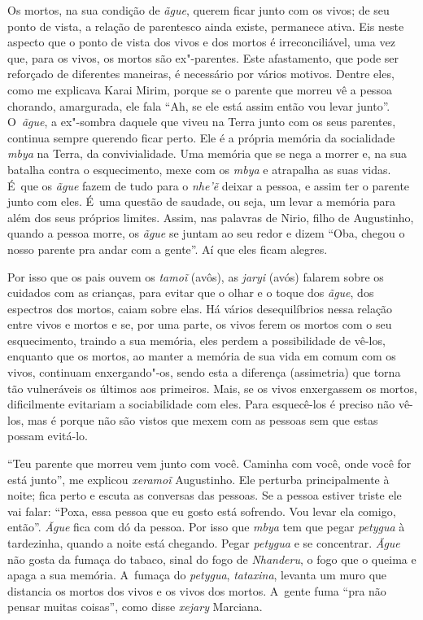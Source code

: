 Os mortos, na sua condição de \emph{ãgue}, querem ficar junto com os vivos; de
seu ponto de vista, a relação de parentesco ainda existe, permanece
ativa. Eis neste aspecto que o ponto de vista dos vivos e dos mortos é
irreconciliável, uma vez que, para os vivos, os mortos são ex"-parentes. 
Este afastamento, que pode ser reforçado de diferentes maneiras, é
necessário por vários motivos. Dentre eles, como me explicava Karai
Mirim, porque se o parente que morreu vê a pessoa chorando, amargurada,
ele fala ``Ah, se ele está assim então vou levar junto''. O~\emph{ãgue}, a
ex"-sombra daquele que viveu na Terra junto com os seus parentes,
continua sempre querendo ficar perto. Ele é a própria memória da
socialidade \emph{mbya} na Terra, da convivialidade. Uma memória que se nega a
morrer e, na sua batalha contra o esquecimento, mexe com os \emph{mbya} e
atrapalha as suas vidas. É~que os \emph{ãgue} fazem de tudo para o \emph{nhe’ẽ}
deixar a pessoa, e assim ter o parente junto com eles. É~uma questão de
saudade, ou seja, um levar a memória para além dos seus próprios
limites. Assim, nas palavras de Nirio, filho de Augustinho, quando a
pessoa morre, os \emph{ãgue} se juntam ao seu redor e dizem ``Oba, chegou o
nosso parente pra andar com a gente''. Aí que eles ficam alegres.

Por isso que os pais ouvem os \emph{tamoĩ} (avôs), as \emph{jaryi} (avós) falarem
sobre os cuidados com as crianças, para evitar que o olhar e o toque
dos \emph{ãgue}, dos espectros dos mortos, caiam sobre elas. Há vários
desequilíbrios nessa relação entre vivos e mortos e se, por uma parte,
os vivos ferem os mortos com o seu esquecimento, traindo a sua memória,
eles perdem a possibilidade de vê-los, enquanto que os mortos, ao
manter a memória de sua vida em comum com os vivos, continuam
enxergando"-os, sendo esta a diferença (assimetria) que torna tão
vulneráveis os últimos aos primeiros. Mais, se os vivos enxergassem os
mortos, dificilmente evitariam a sociabilidade com eles. Para
esquecê-los é preciso não vê-los, mas é porque não são vistos que mexem
com as pessoas sem que estas possam evitá-lo.

``Teu parente que morreu vem junto com você. Caminha com
você, onde você for está junto'', me explicou \emph{xeramoĩ}
Augustinho. Ele perturba principalmente à noite; fica perto e escuta as
conversas das pessoas. Se a pessoa estiver triste ele vai falar: ``Poxa,
essa pessoa que eu gosto está sofrendo. Vou levar ela comigo, então''.
\emph{Ãgue} fica com dó da pessoa. Por isso que \emph{mbya} tem que pegar \emph{petygua}
à tardezinha, quando a noite está chegando. Pegar \emph{petygua} e se
concentrar. \emph{Ãgue} não gosta da fumaça do tabaco, sinal do fogo de
\emph{Nhanderu}, o fogo que o queima e apaga a sua memória. A~fumaça do
\emph{petygua}, \emph{tataxina}, levanta um muro que distancia os mortos dos
vivos e os vivos dos mortos. A~gente fuma ``pra não pensar muitas
coisas'', como disse \emph{xejary} Marciana.

